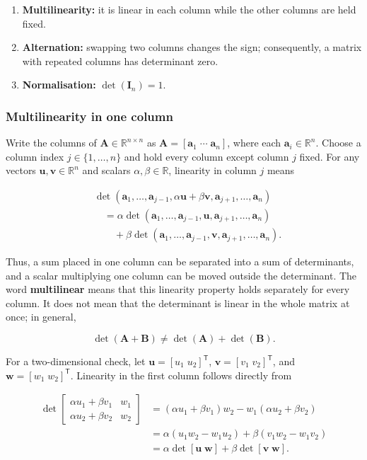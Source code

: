 \documentclass[
  australian,
  12pt,
  letterpaper,
  DIV=11,
  numbers=noendperiod,
  twoside]{scrreprt}
\providecommand{\tightlist}{%
  \setlength{\itemsep}{0pt}\setlength{\parskip}{0pt}}
\begin{document}
\begin{enumerate}
\def\labelenumi{\arabic{enumi}.}
\tightlist
\item
  \textbf{Multilinearity:} it is linear in each column while the other
  columns are held fixed.
\item
  \textbf{Alternation:} swapping two columns changes the sign;
  consequently, a matrix with repeated columns has determinant zero.
\item
  \textbf{Normalisation:} \(\det(\mathbf I_n)=1\).
\end{enumerate}

\subsubsection{Multilinearity in one
column}\label{multilinearity-in-one-column}

Write the columns of \(\mathbf A\in\mathbb R^{n\times n}\) as
\(\mathbf A=[\mathbf a_1\;\cdots\;\mathbf a_n]\), where each
\(\mathbf a_i\in\mathbb R^n\). Choose a column index
\(j\in\{1,\ldots,n\}\) and hold every column except column \(j\) fixed.
For any vectors \(\mathbf u,\mathbf v\in\mathbb R^n\) and scalars
\(\alpha,\beta\in\mathbb R\), linearity in column \(j\) means

\[
\begin{aligned}
&\det(\mathbf a_1,\ldots,\mathbf a_{j-1},\alpha\mathbf u+\beta\mathbf v,\mathbf a_{j+1},\ldots,\mathbf a_n)\\
&\quad=
\alpha\det(\mathbf a_1,\ldots,\mathbf a_{j-1},\mathbf u,\mathbf a_{j+1},\ldots,\mathbf a_n)\\
&\qquad+
\beta\det(\mathbf a_1,\ldots,\mathbf a_{j-1},\mathbf v,\mathbf a_{j+1},\ldots,\mathbf a_n).
\end{aligned}
\]

Thus, a sum placed in one column can be separated into a sum of
determinants, and a scalar multiplying one column can be moved outside
the determinant. The word \textbf{multilinear} means that this linearity
property holds separately for every column. It does not mean that the
determinant is linear in the whole matrix at once; in general,

\[
\det(\mathbf A+\mathbf B)\neq\det(\mathbf A)+\det(\mathbf B).
\]

For a two-dimensional check, let \(\mathbf u=[u_1\;u_2]^\mathsf T\),
\(\mathbf v=[v_1\;v_2]^\mathsf T\), and
\(\mathbf w=[w_1\;w_2]^\mathsf T\). Linearity in the first column
follows directly from

\[
\begin{aligned}
\det\!\begin{bmatrix}\alpha u_1+\beta v_1&w_1\\\alpha u_2+\beta v_2&w_2\end{bmatrix}
&=(\alpha u_1+\beta v_1)w_2-w_1(\alpha u_2+\beta v_2)\\
&=\alpha(u_1w_2-w_1u_2)+\beta(v_1w_2-w_1v_2)\\
&=\alpha\det[\mathbf u\;\mathbf w]+\beta\det[\mathbf v\;\mathbf w].
\end{aligned}
\]
\end{document}
